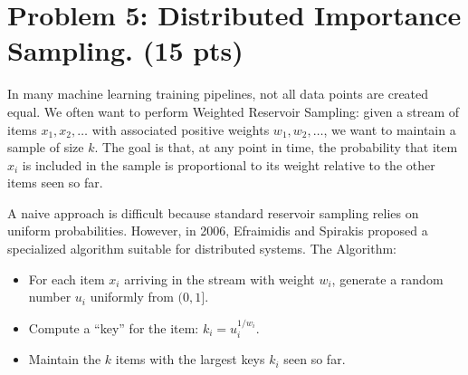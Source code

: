 \documentclass[11pt]{article}
\begin{document}
\section*{Problem 5: Distributed Importance Sampling. (15 pts)}
In many machine learning training pipelines, not all data points are created equal. We often want to perform Weighted Reservoir Sampling: given a stream of items $x_1,x_2,\dots$ with associated positive weights $w_1,w_2,\dots$, we want to maintain a sample of size $k$. The goal is that, at any point in time, the probability that item $x_i$ is included in the sample is proportional to its weight relative to the other items seen so far.

A naive approach is difficult because standard reservoir sampling relies on uniform probabilities. However, in 2006, Efraimidis and Spirakis proposed a specialized algorithm suitable for distributed systems. The Algorithm:
\begin{itemize}
	\item For each item $x_i$ arriving in the stream with weight $w_i$, generate a random number $u_i$ uniformly from $(0,1]$.
	\item Compute a ``key'' for the item: $k_i = u_i^{1/w_i}$.
	\item Maintain the $k$ items with the largest keys $k_i$ seen so far.
\end{itemize}
\end{document}
